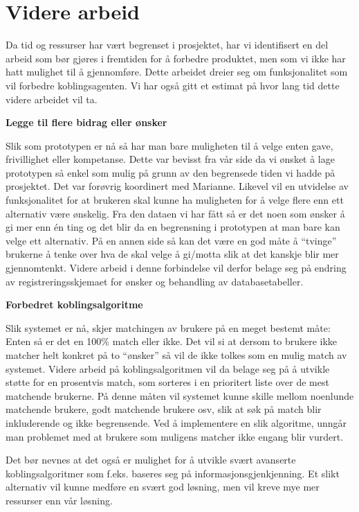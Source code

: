\section{Videre arbeid}

Da tid og ressurser har vært begrenset i prosjektet, har vi identifisert en del arbeid som bør gjøres i fremtiden for å forbedre produktet, men som vi ikke har hatt mulighet til å gjennomføre. Dette arbeidet dreier seg om funksjonalitet som vil forbedre koblingsagenten. Vi har også gitt et estimat på hvor lang tid dette videre arbeidet vil ta.

{\bf Legge til flere bidrag eller ønsker}

Slik som prototypen er nå så har man bare muligheten til å velge enten gave, frivillighet eller kompetanse. Dette var bevisst fra vår side da vi ønsket å lage prototypen så enkel som mulig på grunn av den begrensede tiden vi hadde på prosjektet. Det var forøvrig koordinert med Marianne. Likevel vil en utvidelse av funksjonalitet for at brukeren skal kunne ha muligheten for å velge flere enn ett alternativ være ønskelig. Fra den dataen vi har fått så er det noen som ønsker å gi mer enn én ting og det blir da en begrensning i prototypen at man bare kan velge ett alternativ. På en annen side så kan det være en god måte å ``tvinge” brukerne å tenke over hva de skal velge å gi/motta slik at det kanskje blir mer gjennomtenkt. Videre arbeid i denne forbindelse vil derfor belage seg på endring av registreringsskjemaet for ønsker og behandling av databasetabeller.

{\bf Forbedret koblingsalgoritme}

Slik systemet er nå, skjer matchingen av brukere på en meget bestemt måte: Enten så er det en 100\% match eller ikke. Det vil si at dersom to brukere ikke matcher helt konkret på to ``ønsker” så vil de ikke tolkes som en mulig match av systemet. Videre arbeid på koblingsalgoritmen vil da belage seg på å utvikle støtte for en prosentvis match, som sorteres i en prioritert liste over de mest matchende brukerne. På denne måten vil systemet kunne skille mellom noenlunde matchende brukere, godt matchende brukere osv, slik at søk på match blir inkluderende og ikke begrensende. Ved å implementere en slik algoritme, unngår man problemet med at brukere som muligens matcher ikke engang blir vurdert.

Det bør nevnes at det også er mulighet for å utvikle svært avanserte koblingsalgoritmer som f.eks. baseres seg på informasjonsgjenkjenning. Et slikt alternativ vil kunne medføre en svært god løsning, men vil kreve mye mer ressurser enn vår løsning.

